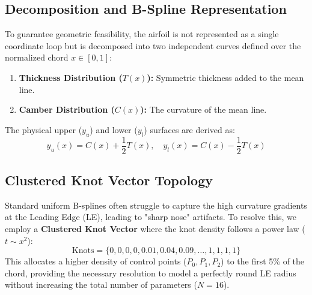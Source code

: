 \documentclass[11pt, a4paper]{article}
\begin{document}
\subsection{Decomposition and B-Spline Representation}
To guarantee geometric feasibility, the airfoil is not represented as a single coordinate loop but is decomposed into two independent curves defined over the normalized chord $x \in [0, 1]$:
\begin{enumerate}
    \item \textbf{Thickness Distribution ($T(x)$):} Symmetric thickness added to the mean line.
    \item \textbf{Camber Distribution ($C(x)$):} The curvature of the mean line.
\end{enumerate}
The physical upper ($y_u$) and lower ($y_l$) surfaces are derived as:
\begin{equation}
    y_u(x) = C(x) + \frac{1}{2}T(x), \quad y_l(x) = C(x) - \frac{1}{2}T(x)
\end{equation}

\subsection{Clustered Knot Vector Topology}
Standard uniform B-splines often struggle to capture the high curvature gradients at the Leading Edge (LE), leading to "sharp nose" artifacts. To resolve this, we employ a \textbf{Clustered Knot Vector} where the knot density follows a power law ($t \sim x^2$):
\begin{equation}
    \text{Knots} = \{0, 0, 0, 0, 0.01, 0.04, 0.09, \dots, 1, 1, 1, 1\}
\end{equation}
This allocates a higher density of control points ($P_0, P_1, P_2$) to the first 5\% of the chord, providing the necessary resolution to model a perfectly round LE radius without increasing the total number of parameters ($N=16$).
\end{document}
